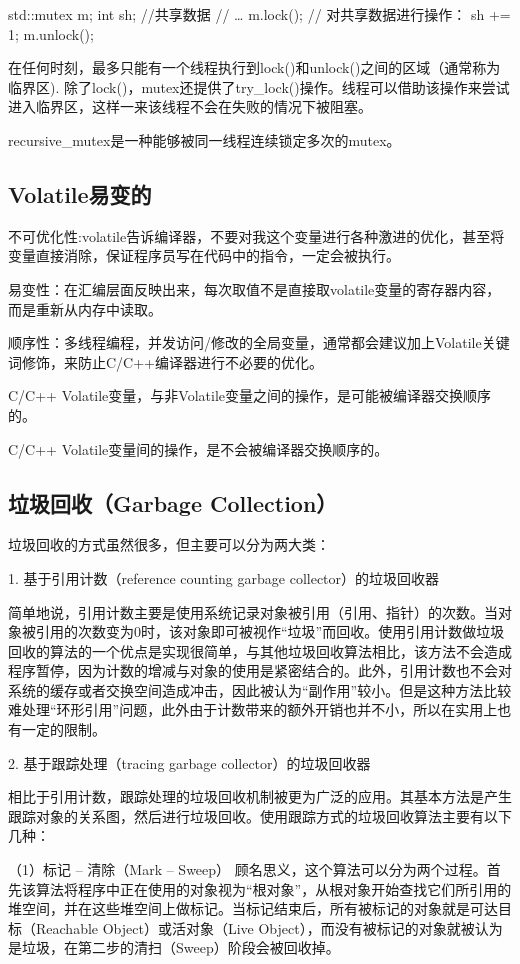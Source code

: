 \begin{Code}
	std::mutex  m;
	int sh; //共享数据
	// …
	m.lock();
	// 对共享数据进行操作：
	sh += 1;
	m.unlock();
\end{Code}
在任何时刻，最多只能有一个线程执行到lock()和unlock()之间的区域（通常称为临界区). 除了lock()，mutex还提供了try_lock()操作。线程可以借助该操作来尝试进入临界区，这样一来该线程不会在失败的情况下被阻塞。

recursive_mutex是一种能够被同一线程连续锁定多次的mutex。

\subsection{Volatile易变的}
不可优化性:volatile告诉编译器，不要对我这个变量进行各种激进的优化，甚至将变量直接消除，保证程序员写在代码中的指令，一定会被执行。

易变性：在汇编层面反映出来，每次取值不是直接取volatile变量的寄存器内容，而是重新从内存中读取。

顺序性：多线程编程，并发访问/修改的全局变量，通常都会建议加上Volatile关键词修饰，来防止C/C++编译器进行不必要的优化。

C/C++ Volatile变量，与非Volatile变量之间的操作，是可能被编译器交换顺序的。

C/C++ Volatile变量间的操作，是不会被编译器交换顺序的。

\subsection{垃圾回收（Garbage Collection）}
垃圾回收的方式虽然很多，但主要可以分为两大类：

1. 基于引用计数（reference counting garbage collector）的垃圾回收器

简单地说，引用计数主要是使用系统记录对象被引用（引用、指针）的次数。当对象被引用的次数变为0时，该对象即可被视作“垃圾”而回收。使用引用计数做垃圾回收的算法的一个优点是实现很简单，与其他垃圾回收算法相比，该方法不会造成程序暂停，因为计数的增减与对象的使用是紧密结合的。此外，引用计数也不会对系统的缓存或者交换空间造成冲击，因此被认为“副作用”较小。但是这种方法比较难处理“环形引用”问题，此外由于计数带来的额外开销也并不小，所以在实用上也有一定的限制。

2. 基于跟踪处理（tracing garbage collector）的垃圾回收器

相比于引用计数，跟踪处理的垃圾回收机制被更为广泛的应用。其基本方法是产生跟踪对象的关系图，然后进行垃圾回收。使用跟踪方式的垃圾回收算法主要有以下几种：

（1）标记 – 清除（Mark – Sweep）
顾名思义，这个算法可以分为两个过程。首先该算法将程序中正在使用的对象视为“根对象”，从根对象开始查找它们所引用的堆空间，并在这些堆空间上做标记。当标记结束后，所有被标记的对象就是可达目标（Reachable 
Object）或活对象（Live Object），而没有被标记的对象就被认为是垃圾，在第二步的清扫（Sweep）阶段会被回收掉。

